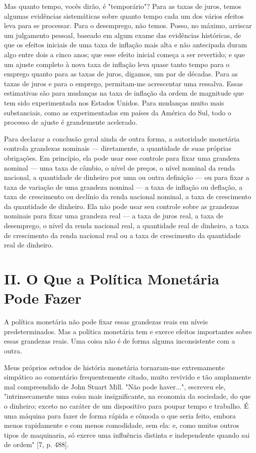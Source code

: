 \documentclass[12pt]{article}
\begin{document}
Mas quanto tempo, vocês dirão, é "temporário"? Para as taxas de juros, temos algumas evidências sistemáticas sobre quanto tempo cada um dos vários efeitos leva para se processar. Para o desemprego, não temos. Posso, no máximo, arriscar um julgamento pessoal, baseado em algum exame das evidências históricas, de que os efeitos iniciais de uma taxa de inflação mais alta e não antecipada duram algo entre dois a cinco anos; que esse efeito inicial começa a ser revertido; e que um ajuste completo à nova taxa de inflação leva quase tanto tempo para o emprego quanto para as taxas de juros, digamos, um par de décadas. Para as taxas de juros e para o emprego, permitam-me acrescentar uma ressalva. Essas estimativas são para mudanças na taxa de inflação da ordem de magnitude que tem sido experimentada nos Estados Unidos. Para mudanças muito mais substanciais, como as experimentadas em países da América do Sul, todo o processo de ajuste é grandemente acelerado.

Para declarar a conclusão geral ainda de outra forma, a autoridade monetária controla grandezas nominais — diretamente, a quantidade de suas próprias obrigações. Em princípio, ela pode usar esse controle para fixar uma grandeza nominal — uma taxa de câmbio, o nível de preços, o nível nominal da renda nacional, a quantidade de dinheiro por uma ou outra definição — ou para fixar a taxa de variação de uma grandeza nominal — a taxa de inflação ou deflação, a taxa de crescimento ou declínio da renda nacional nominal, a taxa de crescimento da quantidade de dinheiro. Ela não pode usar seu controle sobre as grandezas nominais para fixar uma grandeza real — a taxa de juros real, a taxa de desemprego, o nível da renda nacional real, a quantidade real de dinheiro, a taxa de crescimento da renda nacional real ou a taxa de crescimento da quantidade real de dinheiro.

\section*{II. O Que a Política Monetária Pode Fazer}

A política monetária não pode fixar essas grandezas reais em níveis predeterminados. Mas a política monetária tem e exerce efeitos importantes sobre essas grandezas reais. Uma coisa não é de forma alguma inconsistente com a outra.

Meus próprios estudos de história monetária tornaram-me extremamente simpático ao comentário frequentemente citado, muito revivido e tão amplamente mal compreendido de John Stuart Mill. "Não pode haver...", escreveu ele, "intrinsecamente uma coisa mais insignificante, na economia da sociedade, do que o dinheiro; exceto no caráter de um dispositivo para poupar tempo e trabalho. É uma máquina para fazer de forma rápida e cômoda o que seria feito, embora menos rapidamente e com menos comodidade, sem ela: e, como muitos outros tipos de maquinaria, só exerce uma influência distinta e independente quando sai de ordem" [7, p. 488].
\end{document}
